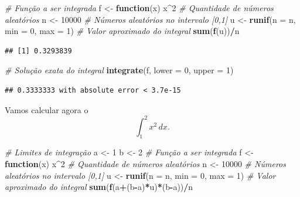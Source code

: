 \documentclass[
]{book}
\newenvironment{Shaded}{\begin{snugshade}}{\end{snugshade}}
\newcommand{\AttributeTok}[1]{\textcolor[rgb]{0.13,0.29,0.53}{#1}}
\newcommand{\CommentTok}[1]{\textcolor[rgb]{0.56,0.35,0.01}{\textit{#1}}}
\newcommand{\ControlFlowTok}[1]{\textcolor[rgb]{0.13,0.29,0.53}{\textbf{#1}}}
\newcommand{\DecValTok}[1]{\textcolor[rgb]{0.00,0.00,0.81}{#1}}
\newcommand{\FunctionTok}[1]{\textcolor[rgb]{0.13,0.29,0.53}{\textbf{#1}}}
\newcommand{\NormalTok}[1]{#1}
\newcommand{\OtherTok}[1]{\textcolor[rgb]{0.56,0.35,0.01}{#1}}
\newcommand{\SpecialCharTok}[1]{\textcolor[rgb]{0.81,0.36,0.00}{\textbf{#1}}}
\begin{document}
\begin{Shaded}
\begin{Highlighting}[]
\CommentTok{\# Função a ser integrada}
\NormalTok{f }\OtherTok{\textless{}{-}} \ControlFlowTok{function}\NormalTok{(x) x}\SpecialCharTok{\^{}}\DecValTok{2}
\CommentTok{\# Quantidade de números aleatórios}
\NormalTok{n }\OtherTok{\textless{}{-}} \DecValTok{10000}
\CommentTok{\# Números aleatórios no intervalo [0,1]}
\NormalTok{u }\OtherTok{\textless{}{-}} \FunctionTok{runif}\NormalTok{(}\AttributeTok{n =}\NormalTok{ n, }\AttributeTok{min =} \DecValTok{0}\NormalTok{, }\AttributeTok{max =} \DecValTok{1}\NormalTok{)}
\CommentTok{\# Valor aproximado do integral}
\FunctionTok{sum}\NormalTok{(}\FunctionTok{f}\NormalTok{(u))}\SpecialCharTok{/}\NormalTok{n}
\end{Highlighting}
\end{Shaded}

\begin{verbatim}
## [1] 0.3293839
\end{verbatim}

\begin{Shaded}
\begin{Highlighting}[]
\CommentTok{\# Solução exata do integral}
\FunctionTok{integrate}\NormalTok{(f, }\AttributeTok{lower =} \DecValTok{0}\NormalTok{, }\AttributeTok{upper =} \DecValTok{1}\NormalTok{)}
\end{Highlighting}
\end{Shaded}

\begin{verbatim}
## 0.3333333 with absolute error < 3.7e-15
\end{verbatim}

Vamos calcular agora o \[\int_{1}^{2} x^2\, dx.\]

\begin{Shaded}
\begin{Highlighting}[]
\CommentTok{\# Limites de integração}
\NormalTok{a }\OtherTok{\textless{}{-}} \DecValTok{1}
\NormalTok{b }\OtherTok{\textless{}{-}} \DecValTok{2}
\CommentTok{\# Função a ser integrada}
\NormalTok{f }\OtherTok{\textless{}{-}} \ControlFlowTok{function}\NormalTok{(x) x}\SpecialCharTok{\^{}}\DecValTok{2}
\CommentTok{\# Quantidade de números aleatórios}
\NormalTok{n }\OtherTok{\textless{}{-}} \DecValTok{10000}
\CommentTok{\# Números aleatórios no intervalo [0,1]}
\NormalTok{u }\OtherTok{\textless{}{-}} \FunctionTok{runif}\NormalTok{(}\AttributeTok{n =}\NormalTok{ n, }\AttributeTok{min =} \DecValTok{0}\NormalTok{, }\AttributeTok{max =} \DecValTok{1}\NormalTok{)}
\CommentTok{\# Valor aproximado do integral}
\FunctionTok{sum}\NormalTok{(}\FunctionTok{f}\NormalTok{(a}\SpecialCharTok{+}\NormalTok{(b}\SpecialCharTok{{-}}\NormalTok{a)}\SpecialCharTok{*}\NormalTok{u)}\SpecialCharTok{*}\NormalTok{(b}\SpecialCharTok{{-}}\NormalTok{a))}\SpecialCharTok{/}\NormalTok{n}
\end{Highlighting}
\end{Shaded}
\end{document}
